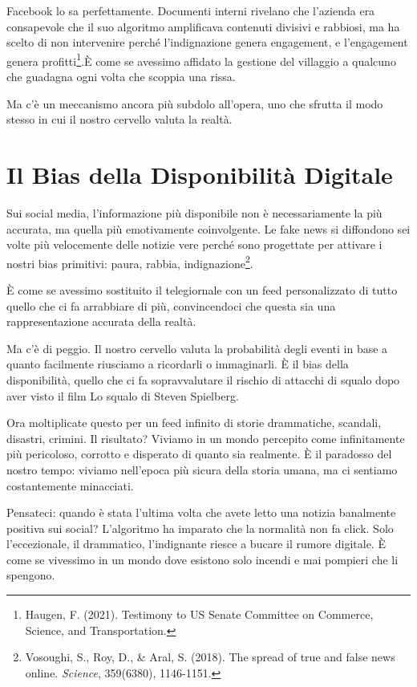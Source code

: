 Facebook lo sa perfettamente. Documenti interni rivelano che l'azienda era consapevole che il suo algoritmo amplificava contenuti divisivi e rabbiosi, ma ha scelto di non intervenire perché l'indignazione genera engagement, e l'engagement genera profitti\footnote{Haugen, F. (2021). Testimony to US Senate Committee on Commerce, Science, and Transportation.}.È come se avessimo affidato la gestione del villaggio a qualcuno che guadagna ogni volta che scoppia una rissa.

Ma c'è un meccanismo ancora più subdolo all'opera, uno che sfrutta il modo stesso in cui il nostro cervello valuta la realtà.

\section{Il Bias della Disponibilità Digitale}

Sui social media, l'informazione più disponibile non è necessariamente la più accurata, ma quella più emotivamente coinvolgente. Le fake news si diffondono sei volte più velocemente delle notizie vere perché sono progettate per attivare i nostri bias primitivi: paura, rabbia, indignazione\footnote{Vosoughi, S., Roy, D., \& Aral, S. (2018). The spread of true and false news online. \textit{Science}, 359(6380), 1146-1151.}.

È come se avessimo sostituito il telegiornale con un feed personalizzato di tutto quello che ci fa arrabbiare di più, convincendoci che questa sia una rappresentazione accurata della realtà.

Ma c'è di peggio. Il nostro cervello valuta la probabilità degli eventi in base a quanto facilmente riusciamo a ricordarli o immaginarli. È il bias della disponibilità, quello che ci fa sopravvalutare il rischio di attacchi di squalo dopo aver visto il film Lo squalo di Steven Spielberg.

Ora moltiplicate questo per un feed infinito di storie drammatiche, scandali, disastri, crimini. Il risultato? Viviamo in un mondo percepito come infinitamente più pericoloso, corrotto e disperato di quanto sia realmente. È il paradosso del nostro tempo: viviamo nell'epoca più sicura della storia umana, ma ci sentiamo costantemente minacciati.

Pensateci: quando è stata l'ultima volta che avete letto una notizia banalmente positiva sui social? L'algoritmo ha imparato che la normalità non fa click. Solo l'eccezionale, il drammatico, l'indignante riesce a bucare il rumore digitale. È come se vivessimo in un mondo dove esistono solo incendi e mai pompieri che li spengono.

